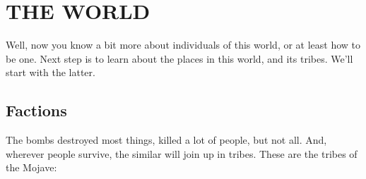 \section{THE WORLD}

Well, now you know a bit more about individuals of this world, or at least how to be one. Next step is to learn about the places in this world, and its tribes. We'll start with the latter.

\subsection{Factions}

The bombs destroyed most things, killed a lot of people, but not all. And, wherever people survive, the similar will join up in tribes. These are the tribes of the Mojave:

